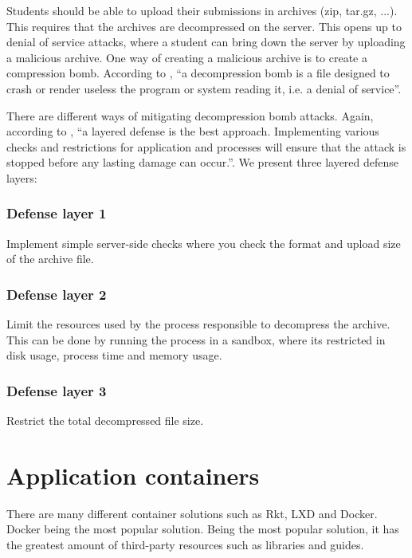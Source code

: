Students should be able to upload their submissions in archives (zip, tar.gz, ...). This requires that the archives are decompressed on the server. This opens up to denial of service attacks, where a student can bring down the server by uploading a malicious archive. One way of creating a malicious archive is to create a compression bomb. According to \citet{Cara2019Bomb.codes}, ``a decompression bomb is a file designed to crash or render useless the program or system reading it, i.e. a denial of service''.

There are different ways of mitigating decompression bomb attacks. Again, according to \citet{Cara2019Bomb.codes}, ``a layered defense is the best approach. Implementing various checks and restrictions for application and processes will ensure that the attack is stopped before any lasting damage can occur.''. We present three layered defense layers:

\subsubsection*{Defense layer 1}

Implement simple server-side checks where you check the format and upload size of the archive file.

\subsubsection*{Defense layer 2}
\label{defense_layer_2}

Limit the resources used by the process responsible to decompress the archive. This can be done by running the process in a sandbox, where its restricted in disk usage, process time and memory usage.

\subsubsection*{Defense layer 3}

Restrict the total decompressed file size.

\section{Application containers}

There are many different container solutions such as Rkt, LXD and Docker. Docker being the most popular solution. Being the most popular solution, it has the greatest amount of third-party resources such as libraries and guides.

